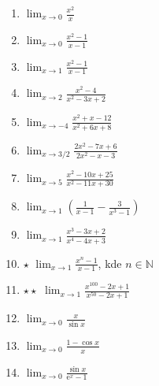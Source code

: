 \documentclass[12pt,a4paper]{article}
\def\vysl#1{}
\begin{document}
\begin{enumerate}
	\everymath{\displaystyle}
	\parskip\bigskipamount
	\item $\lim_{x\to0} \frac{x^2}{x}$ \vysl{0}
	\item $\lim_{x\to0} \frac{x^2-1}{x-1}$ \vysl{1}
	\item $\lim_{x\to1} \frac{x^2-1}{x-1}$ \vysl{2}
	\item $\lim_{x\to2} \frac{x^2-4}{x^2 - 3x + 2}$ \vysl{4}
	\item $\lim_{x\to-4} \frac{x^2+x-12}{x^2+6x+8}$ \vysl{-3/2}
	
	
	\item $\lim_{x\to3/2} \frac{2x^2 - 7x + 6}{2x^2 - x - 3}$ \vysl{-1/5}
	\item $\lim_{x\to5} \frac{x^2 - 10x + 25}{x^2 - 11x + 30}$ \vysl{0}
	
	
	\item $\lim_{x\to1} \left(\frac{1}{x-1} - \frac{3}{x^3-1}\right)$ \vysl{1}
	\item $\lim_{x\to1} \frac{x^3 - 3x + 2}{x^4 - 4x + 3}$
	\item $\star$ $\lim_{x\to1} \frac{x^n-1}{x-1}$, kde $n \in \mathbb N$ \vysl{-3/2}
	\item $\star\star$ $\lim_{x\to1} \frac{x^{100} - 2x + 1}{x^{50} - 2x + 1}$
	\item $\lim_{x \to 0} \frac{x}{\sin x}$ \vysl{1}
	\item $\lim_{x \to 0} \frac{1 - \cos x}{x}$ \vysl{0}
	\item $\lim_{x \to 0} \frac{\sin x}{\mathrm{e}^x - 1}$ \vysl{1}
\end{enumerate}
\end{document}
